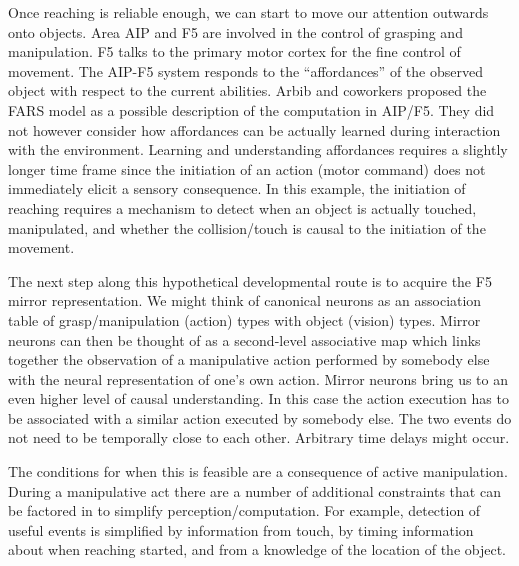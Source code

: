 Once reaching is reliable enough, we can start to move our attention 
outwards onto objects. Area AIP and F5 are involved in the
control of grasping and manipulation. F5 talks to the 
primary motor cortex for the fine control of movement. 
The AIP-F5 system responds to the ``affordances'' of the observed 
object with respect to the
current abilities.
Arbib and coworkers \cite{fagg-arbib-1998} proposed 
the FARS model as a possible description of the computation in AIP/F5. 
They did not however consider how affordances can be 
actually learned during interaction with the environment. 
Learning and understanding affordances requires a slightly longer 
time frame since the initiation of an action (motor command) does not
immediately elicit a sensory consequence. In this example, the initiation
of reaching requires a mechanism to detect when an object is actually 
touched, manipulated, and whether the collision/touch is causal to the
initiation of the movement.

The next step along this hypothetical developmental route is to 
acquire the F5 mirror representation. We might think of canonical neurons as
an association table of grasp/manipulation (action) types with object
(vision) types.  Mirror neurons can then be thought of as a 
second-level associative map which links together the observation of 
a manipulative action performed by somebody else with the neural 
representation of one's own action.
Mirror neurons bring us to an even higher level of causal 
understanding. In this case the action execution has to be associated
with a similar action executed by somebody else. The two events
do not need to be temporally close to each other. Arbitrary time delays
might occur.

The conditions for when this is feasible are a consequence of active
manipulation. During a manipulative act there are a number of
additional constraints that can be factored in to simplify
perception/computation.  For example, detection of useful events is
simplified by information from touch, by timing information 
about when
reaching started, and from a knowledge of the location of the object.%

